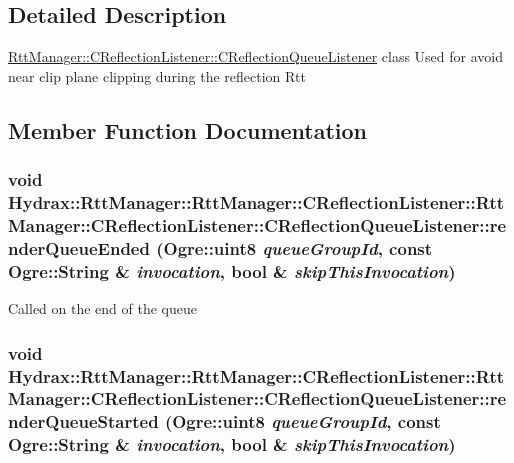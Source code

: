 \subsection{Detailed Description}
\hyperlink{class_hydrax_1_1_rtt_manager_1_1_c_reflection_listener_1_1_c_reflection_queue_listener}{RttManager::CReflectionListener::CReflectionQueueListener} class Used for avoid near clip plane clipping during the reflection Rtt 

\subsection{Member Function Documentation}
\hypertarget{class_hydrax_1_1_rtt_manager_1_1_c_reflection_listener_1_1_c_reflection_queue_listener_2f4b7681352adf5b6347beaf104f0896}{
\subsubsection[{renderQueueEnded}]{\setlength{\rightskip}{0pt plus 5cm}void Hydrax::RttManager::RttManager::CReflectionListener::RttManager::CReflectionListener::CReflectionQueueListener::renderQueueEnded (Ogre::uint8 {\em queueGroupId}, \/  const Ogre::String \& {\em invocation}, \/  bool \& {\em skipThisInvocation})}}
\label{class_hydrax_1_1_rtt_manager_1_1_c_reflection_listener_1_1_c_reflection_queue_listener_2f4b7681352adf5b6347beaf104f0896}


Called on the end of the queue \hypertarget{class_hydrax_1_1_rtt_manager_1_1_c_reflection_listener_1_1_c_reflection_queue_listener_d1152ff369e7fa6a37bef7892611f0c0}{
\subsubsection[{renderQueueStarted}]{\setlength{\rightskip}{0pt plus 5cm}void Hydrax::RttManager::RttManager::CReflectionListener::RttManager::CReflectionListener::CReflectionQueueListener::renderQueueStarted (Ogre::uint8 {\em queueGroupId}, \/  const Ogre::String \& {\em invocation}, \/  bool \& {\em skipThisInvocation})}}
\label{class_hydrax_1_1_rtt_manager_1_1_c_reflection_listener_1_1_c_reflection_queue_listener_d1152ff369e7fa6a37bef7892611f0c0}


